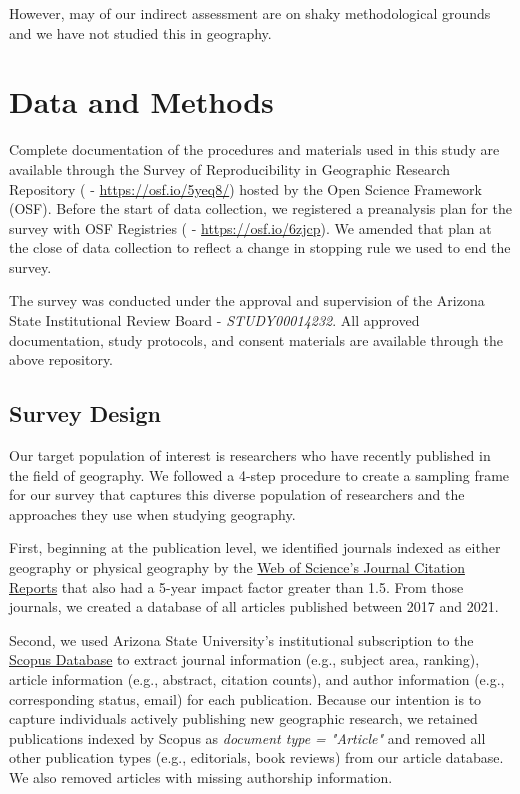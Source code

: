 \documentclass[]{interact}
\theoremstyle{plain}%
\theoremstyle{definition}
\theoremstyle{remark}
\begin{document}
However, may of our indirect assessment are on shaky methodological grounds and we have not studied this in geography. 



\section*{Data and Methods}
Complete documentation of the procedures and materials used in this study are available through the Survey of Reproducibility in Geographic Research Repository (\citet{Kedron_Holler_Bardin_Hilgendorf_2022} - \url{https://osf.io/5yeq8/}) hosted by the Open Science Framework (OSF). 
Before the start of data collection, we registered a preanalysis plan for the survey with OSF Registries (\citet{Kedron_Survey_PAP} - \url{https://osf.io/6zjcp}). 
We amended that plan at the close of data collection to reflect a change in stopping rule we used to end the survey. 

The survey was conducted under the approval and supervision of the Arizona State Institutional Review Board - \textit{STUDY00014232}.
All approved documentation, study protocols, and consent materials are available through the above repository.

\subsection*{Survey Design}
Our target population of interest is researchers who have recently published in the field of geography. 
We followed a 4-step procedure to create a sampling frame for our survey that captures this diverse population of researchers and the approaches they use when studying geography. 

First, beginning at the publication level, we identified journals indexed as either geography or physical geography by the \href{https://access.clarivate.com/}{Web of Science's Journal Citation Reports} that also had a 5-year impact factor greater than 1.5.
From those journals, we created a database of all articles published between 2017 and 2021.  

Second, we used Arizona State University's institutional subscription to the \href{https://www.scopus.com/home.uri}{Scopus Database} to extract journal information (e.g., subject area, ranking), article information (e.g., abstract, citation counts), and author information (e.g., corresponding status, email) for each publication. 
Because our intention is to capture individuals actively publishing new geographic research, we retained publications indexed by Scopus as \textit{document type = "Article"} and removed all other publication types (e.g., editorials, book reviews) from our article database. 
We also removed articles with missing authorship information. 
\end{document}
